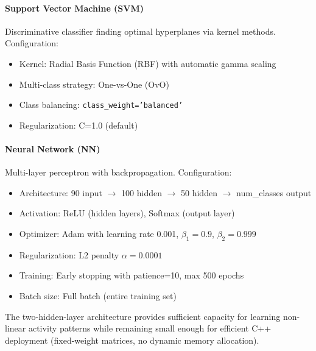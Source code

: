 \paragraph{Support Vector Machine (SVM)}
Discriminative classifier finding optimal hyperplanes via kernel methods. Configuration:
\begin{itemize}
    \item Kernel: Radial Basis Function (RBF) with automatic gamma scaling
    \item Multi-class strategy: One-vs-One (OvO)
    \item Class balancing: \texttt{class\_weight='balanced'}
    \item Regularization: C=1.0 (default)
\end{itemize}

\paragraph{Neural Network (NN)}
Multi-layer perceptron with backpropagation. Configuration:
\begin{itemize}
    \item Architecture: 90 input $\rightarrow$ 100 hidden $\rightarrow$ 50 hidden $\rightarrow$ num\_classes output
    \item Activation: ReLU (hidden layers), Softmax (output layer)
    \item Optimizer: Adam with learning rate 0.001, $\beta_1=0.9$, $\beta_2=0.999$
    \item Regularization: L2 penalty $\alpha=0.0001$
    \item Training: Early stopping with patience=10, max 500 epochs
    \item Batch size: Full batch (entire training set)
\end{itemize}
The two-hidden-layer architecture provides sufficient capacity for learning non-linear activity patterns while remaining small enough for efficient C++ deployment (fixed-weight matrices, no dynamic memory allocation).

